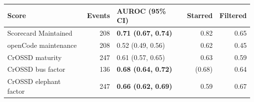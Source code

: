 \begin{tabular}{lrlrr}
\toprule
Score & Events & AUROC (95\% CI) & Starred & Filtered \\
\midrule
Scorecard Maintained & 208 & \textbf{0.71 (0.67, 0.74)} & 0.82 & 0.65 \\
openCode maintenance & 208 & 0.52 (0.49, 0.56) & 0.62 & 0.45 \\
CrOSSD maturity & 247 & 0.61 (0.57, 0.65) & 0.63 & 0.59 \\
CrOSSD bus factor & 136 & \textbf{0.68 (0.64, 0.72)} & (0.68) & 0.64 \\
CrOSSD elephant factor & 247 & \textbf{0.66 (0.62, 0.69)} & 0.59 & 0.67 \\
\bottomrule
\end{tabular}
